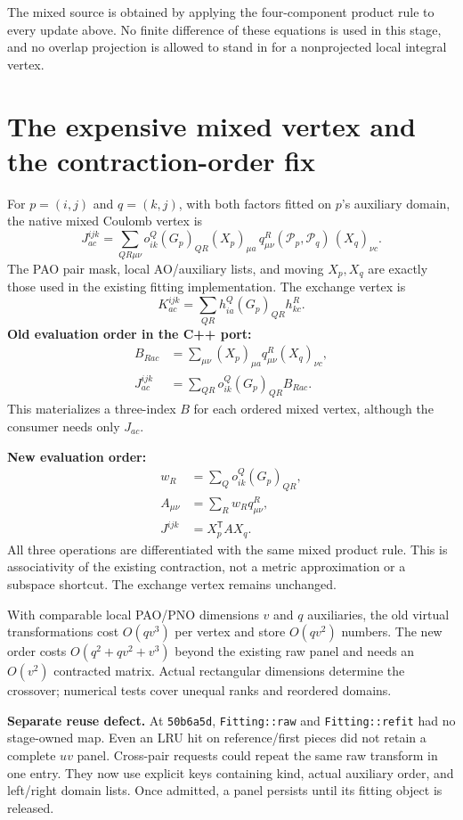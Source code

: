 \documentclass[10pt,letterpaper]{article}
\newcommand{\T}{^{\mathsf T}}
\newcommand{\sectionpage}[1]{\newpage\section{#1}}
\begin{document}
The mixed source is obtained by applying the four-component product rule to every update above. No finite difference of these equations is used in this stage, and no overlap projection is allowed to stand in for a nonprojected local integral vertex.

\sectionpage{The expensive mixed vertex and the contraction-order fix}
For $p=(i,j)$ and $q=(k,j)$, with both factors fitted on $p$'s auxiliary domain, the native mixed Coulomb vertex is
\begin{equation}
J_{ac}^{ijk}=\sum_{QR\mu\nu}
 o_{ik}^Q(G_p)_{QR}(X_p)_{\mu a}\,
 q_{\mu\nu}^{R}(\mathcal P_p,\mathcal P_q)\,(X_q)_{\nu c}.
\end{equation}
The PAO pair mask, local AO/auxiliary lists, and moving $X_p,X_q$ are exactly those used in the existing fitting implementation. The exchange vertex is
\begin{equation}
K_{ac}^{ijk}=\sum_{QR}h_{ia}^Q(G_p)_{QR}h_{kc}^R.
\end{equation}
\textbf{Old evaluation order in the C++ port:}
\begin{align}
B_{Rac}&=\sum_{\mu\nu}(X_p)_{\mu a}q^R_{\mu\nu}(X_q)_{\nu c},\\
J_{ac}^{ijk}&=\sum_{QR}o_{ik}^Q(G_p)_{QR}B_{Rac}.
\end{align}
This materializes a three-index $B$ for each ordered mixed vertex, although the consumer needs only $J_{ac}$.

\textbf{New evaluation order:}
\begin{align}
w_R&=\sum_Qo_{ik}^Q(G_p)_{QR},\\
A_{\mu\nu}&=\sum_R w_Rq^R_{\mu\nu},\\
J^{ijk}&=X_p\T A X_q.
\end{align}
All three operations are differentiated with the same mixed product rule. This is associativity of the existing contraction, not a metric approximation or a subspace shortcut. The exchange vertex remains unchanged.

With comparable local PAO/PNO dimensions $v$ and $q$ auxiliaries, the old virtual transformations cost $O(qv^3)$ per vertex and store $O(qv^2)$ numbers. The new order costs $O(q^2+qv^2+v^3)$ beyond the existing raw panel and needs an $O(v^2)$ contracted matrix. Actual rectangular dimensions determine the crossover; numerical tests cover unequal ranks and reordered domains.

\textbf{Separate reuse defect.} At \texttt{50b6a5d}, \texttt{Fitting::raw} and \texttt{Fitting::refit} had no stage-owned map. Even an LRU hit on reference/first pieces did not retain a complete $uv$ panel. Cross-pair requests could repeat the same raw transform in one entry. They now use explicit keys containing kind, actual auxiliary order, and left/right domain lists. Once admitted, a panel persists until its fitting object is released.
\end{document}
